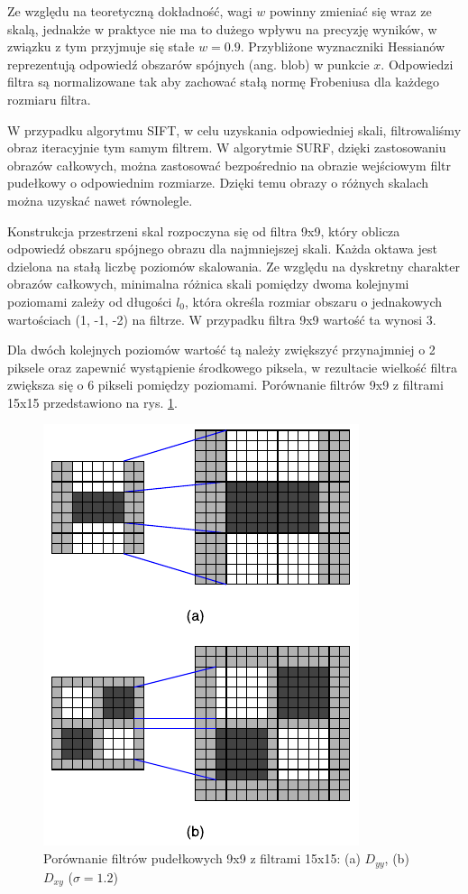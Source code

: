 Ze względu na teoretyczną dokładność, wagi $w$ powinny zmieniać się wraz ze skalą, jednakże w praktyce nie ma to dużego wpływu na precyzję wyników, w związku z tym przyjmuje się stałe $w = 0.9$. Przybliżone wyznaczniki Hessianów reprezentują odpowiedź obszarów spójnych ({ang. blob}) w punkcie $x$. Odpowiedzi filtra są normalizowane tak aby zachować stałą normę Frobeniusa dla każdego rozmiaru filtra.

W przypadku algorytmu SIFT, w celu uzyskania odpowiedniej skali, filtrowaliśmy obraz iteracyjnie tym samym filtrem. W algorytmie SURF, dzięki zastosowaniu obrazów całkowych, można zastosować bezpośrednio na obrazie wejściowym filtr pudełkowy o odpowiednim rozmiarze. Dzięki temu obrazy o różnych skalach można uzyskać nawet równolegle. 

Konstrukcja przestrzeni skal rozpoczyna się od filtra 9x9, który oblicza odpowiedź obszaru spójnego obrazu dla najmniejszej skali. Każda oktawa jest dzielona na stałą liczbę poziomów skalowania. Ze względu na dyskretny charakter obrazów całkowych, minimalna różnica skali pomiędzy dwoma kolejnymi poziomami zależy od długości $l_0$, która określa rozmiar obszaru o jednakowych wartościach (1, -1, -2) na filtrze. W przypadku filtra 9x9 wartość ta wynosi 3.

Dla dwóch kolejnych poziomów wartość tą należy zwiększyć przynajmniej o 2 piksele oraz zapewnić wystąpienie środkowego piksela, w rezultacie wielkość filtra zwiększa się o 6 pikseli pomiędzy poziomami. Porównanie filtrów 9x9 z filtrami 15x15 przedstawiono na rys. \ref{fig:surf-9-to-15}.

\begin{figure}[h]
	\centering
	\includegraphics[scale=1.5]{graphics/01_podstawy_teoretyczne/surf-9-to-15.pdf}
	\caption{Porównanie filtrów pudełkowych 9x9 z filtrami 15x15: (a) $D_{yy}$, (b) $D_{xy}$ ($\sigma = 1.2$) \cite{BAY08}}
	\label{fig:surf-9-to-15}
\end{figure}

